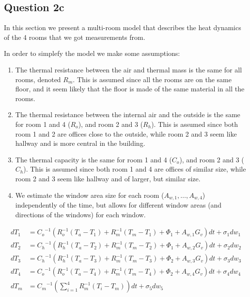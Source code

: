 \documentclass[a4paper]{article}
\begin{document}
\subsection{Question 2c}
In this section we present a multi-room model that describes
the heat dynamics of the 4 rooms that we got measurements from.

In order to simplefy the model we make some assumptions:
\begin{enumerate}
    \item The thermal resistance between the air and thermal mass is the same for all rooms, denoted $R_m$. This is assumed since all the rooms are on the same floor, and it seem likely that the floor is made of the same material in all the rooms. 
    \item The thermal resistance between the internal air and the outside is the same for room 1 and 4 ($R_o$), and room 2 and 3 ($R_h$). This is assumed since both room 1 and 2 are offices close to the outside, while room 2 and 3 seem like hallway and is more central in the building.
    \item The thermal capacity is the same for room 1 and 4 ($C_o$), and room 2 and 3 ($C_h$). This is assumed since both room 1 and 4 are offices of similar size, while room 2 and 3 seem like hallway and of larger, but similar size.
    \item We estimate the window area size for each room ($A_{w,1}, \ldots, A_{w,4}$) independently of the time, but allows for different window areas (and directions of the windows) for each window.
\end{enumerate}

\begin{align}
    dT_1 &= {C_o}^{-1} \left( R_o^{-1} (T_a - T_1) + R_m^{-1} (T_m - T_1) + \Phi_1 + A_{w,1} G_v \right) \mathit{dt} + \sigma_1 \mathit{dw}_1 \\
    dT_2 &= {C_h}^{-1} \left( R_h^{-1} (T_a - T_2) + R_m^{-1} (T_m - T_2) + \Phi_1 + A_{w,2} G_v \right) \mathit{dt} + \sigma_2 \mathit{dw}_2 \\
    dT_3 &= {C_h}^{-1} \left( R_h^{-1} (T_a - T_3) + R_m^{-1} (T_m - T_3) + \Phi_2 + A_{w,3} G_v \right) \mathit{dt} + \sigma_3 \mathit{dw}_3 \\
    dT_4 &= {C_o}^{-1} \left( R_o^{-1} (T_a - T_4) + R_m^{-1} (T_m - T_4) + \Phi_2 + A_{w,4} G_v \right) \mathit{dt} + \sigma_4 \mathit{dw}_4 \\
    dT_m &= {C_m}^{-1} \left( \sum_{i = 1}^4 R_m^{-1} (T_i - T_m) \right) \mathit{dt} + \sigma_5 \mathit{dw}_5 
\end{align}
\end{document}
